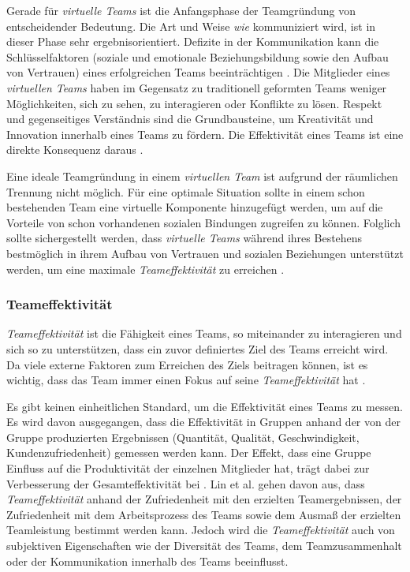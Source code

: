 \documentclass[a4paper,11pt]{article}%
\renewcommand{\\}{\vspace*{0.5\baselineskip} \newline}
\begin{document}
{Gerade für \textit{virtuelle Teams} ist die Anfangsphase der Teamgründung von entscheidender Bedeutung. 
Die Art und Weise \textit{wie} kommuniziert wird, ist in dieser Phase sehr ergebnisorientiert. Defizite in der Kommunikation kann die Schlüsselfaktoren (soziale und emotionale Beziehungsbildung sowie den Aufbau von Vertrauen) eines erfolgreichen Teams beeinträchtigen \citep[S. 378]{ren2007applying}.
Die Mitglieder eines \textit{virtuellen Teams} haben im Gegensatz zu traditionell geformten Teams weniger Möglichkeiten, sich zu sehen, zu interagieren oder Konflikte zu lösen. 
Respekt und gegenseitiges Verständnis sind die Grundbausteine, um Kreativität und Innovation innerhalb eines Teams zu fördern. Die Effektivität eines Teams ist eine direkte Konsequenz daraus \citep[S. 378]{ren2007applying}.

Eine ideale Teamgründung in einem \textit{virtuellen Team} ist aufgrund der räumlichen Trennung nicht möglich. 
Für eine optimale Situation sollte in einem schon bestehenden Team eine virtuelle Komponente hinzugefügt werden, um auf die Vorteile von schon vorhandenen sozialen Bindungen zugreifen zu können. Folglich sollte sichergestellt werden, dass \textit{virtuelle Teams} während ihres Bestehens bestmöglich in ihrem Aufbau von Vertrauen und sozialen Beziehungen unterstützt werden, um eine maximale \textit{Teameffektivität} zu erreichen \citep[S. 36-37]{holton2001building}.

\subsubsection{Teameffektivität}
\label{Teameffektivität}
\textit{Teameffektivität} ist die Fähigkeit eines Teams, so miteinander zu interagieren und sich so zu unterstützen, dass ein zuvor definiertes Ziel des Teams erreicht wird. Da viele externe Faktoren zum Erreichen des Ziels beitragen können, ist es wichtig, dass das Team immer einen Fokus auf seine \textit{Teameffektivität} hat \citep[S. 557]{salas2005there}.

Es gibt keinen einheitlichen Standard, um die Effektivität eines Teams zu messen. Es wird davon ausgegangen, dass die Effektivität in Gruppen anhand der von der Gruppe produzierten Ergebnissen (Quantität, Qualität, Geschwindigkeit, Kundenzufriedenheit) gemessen werden kann. Der Effekt, dass eine Gruppe Einfluss auf die Produktivität der einzelnen Mitglieder hat, trägt dabei zur Verbesserung der Gesamteffektivität bei \citep[S. 309]{guzzo1996teams}.
Lin et al. \citep{lin2008model} gehen davon aus, dass \textit{Teameffektivität} anhand der Zufriedenheit mit den erzielten Teamergebnissen, der Zufriedenheit mit dem Arbeitsprozess des Teams sowie dem Ausmaß der erzielten Teamleistung bestimmt werden kann.
Jedoch wird die \textit{Teameffektivität} auch von subjektiven Eigenschaften wie der Diversität des Teams, dem Teamzusammenhalt oder der Kommunikation innerhalb des Teams beeinflusst. 

}
\end{document}
